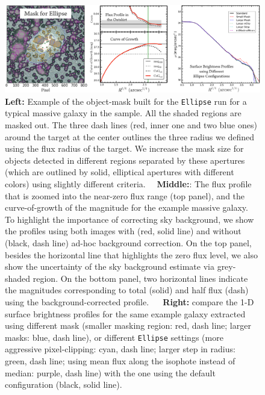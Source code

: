 \documentclass{emulateapj}
\begin{document}
\begin{CJK*}{UTF8}{gbsn}
    \begin{figure}[hbt!]
        \centering 
        \includegraphics[width=\textwidth]{fig/redbcg_ellipse_tech}
        \caption{\textbf{Left:} Example of the object-mask built for the \texttt{Ellipse}
            run for a typical massive galaxy in the sample. 
            All the shaded regions are masked out. 
            The three dash lines (red, inner one and two blue ones) around the target 
            at the center outlines the three radius we defined using the flux radius 
            of the target.  
            We increase the mask size for objects detected in different regions 
            separated by these apertures (which are outlined by solid, elliptical 
            apertures with different colors) using slightly different criteria.~~
            \textbf{Middle:}: The flux profile that is zoomed into the near-zero flux 
            range (top panel), and the curve-of-growth of the magnitude for the example
            massive galaxy.  
            To highlight the importance of correcting sky background, we show the profiles 
            using both images with (red, solid line) and without (black, dash line) 
            ad-hoc background correction. 
            On the top panel, besides the horizontal line that highlights the zero flux 
            level, we also show the uncertainty of the sky background estimate via 
            grey-shaded region.  
            On the bottom panel, two horizontal lines indicate the magnitudes 
            corresponding to total (solid) and half flux (dash) using the 
            background-corrected profile. ~~
            \textbf{Right:} compare the 1-D surface brightness profiles for the same 
            example galaxy extracted using different mask 
            (smaller masking region: red, dash line; larger masks: blue, dash line), 
            or different \texttt{Ellipse} settings
            (more aggressive pixel-clipping: cyan, dash line; 
             larger step in radius: green, dash line; 
             using mean flux along the isophote instead of median: purple, dash line)
            with the one using the default configuration (black, solid line).}
        \label{figure:A1}
    \end{figure}


\end{CJK*}
\end{document}
